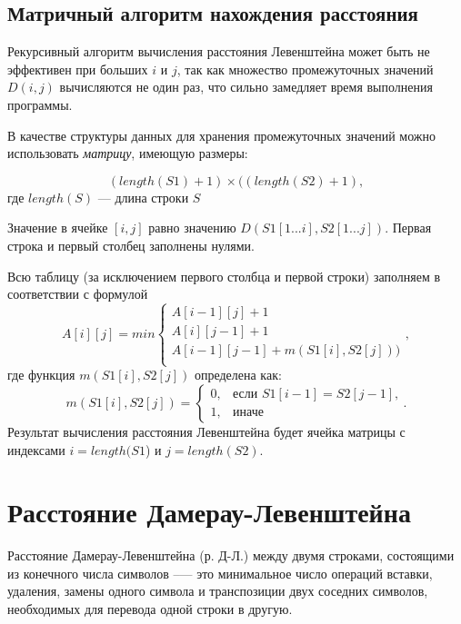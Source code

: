 \subsection{Матричный алгоритм нахождения расстояния}

Рекурсивный алгоритм вычисления расстояния Левенштейна может быть не эффективен при больших $i$ и $j$, так как множество промежуточных значений $D(i, j)$ вычисляются не один раз, что сильно замедляет время выполнения программы.

В качестве структуры данных для хранения промежуточных значений можно использовать \textit{матрицу}, имеющую  размеры:

\begin{equation}
	(length(S1)+ 1) \times ((length(S2) + 1),
\end{equation}
где $length(S)$ --- длина строки $S$

Значение в ячейке $[i, j]$ равно значению $D(S1[1...i], S2[1...j])$. Первая строка и первый столбец заполнены нулями.

Всю таблицу (за исключением первого столбца и первой строки) заполняем в соответствии с формулой
\begin{equation}
	\label{eq:mat1}
	A[i][j] = min \begin{cases}
		A[i-1][j] + 1\\
		A[i][j-1] + 1\\
		A[i-1][j-1] + m(S1[i], S2[j]))\\
	\end{cases},
\end{equation}
где функция $m(S1[i], S2[j])$ определена как:
\begin{equation}
	\label{eq:m2}
	m(S1[i], S2[j]) = \begin{cases}
		0, &\text{если $S1[i - 1] = S2[j - 1]$,}\\
		1, &\text{иначе}
	\end{cases}.
\end{equation}
Результат вычисления расстояния Левенштейна будет ячейка матрицы с индексами $i = length(S1$) и $j = length(S2)$.

\section{Расстояние Дамерау-Левенштейна}

Расстояние Дамерау-Левенштейна (р. Д-Л.) между двумя строками, состоящими из конечного числа символов --— это минимальное число операций вставки, удаления, замены одного символа и транспозиции двух соседних символов, необходимых для перевода одной строки в другую.

